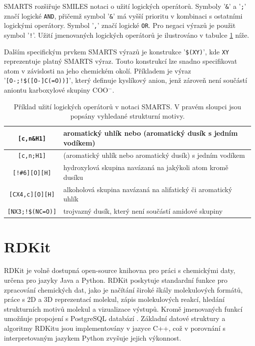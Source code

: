 SMARTS rozšiřuje SMILES notaci o užití logických operátorů. Symboly '\verb|&|' a '\verb|;|' značí logické \verb|AND|, přičemž symbol '\verb|&|' má vyšší prioritu v kombinaci s ostatními logickými operátory. Symbol '\verb|,|' značí logické \verb|OR|. Pro negaci výrazů je použit symbol '\verb|!|'. Užití jmenovaných logických operátorů je ilustrováno v tabulce \ref{logops} níže.

Dalším specifickým prvkem SMARTS výrazů je konstrukce  '\verb|$(XY)|', kde \verb|XY| reprezentuje platný SMARTS výraz. Touto konstrukcí lze snadno specifikovat atom v závislosti na jeho chemickém okolí. Příkladem je výraz '\verb|[O-;!$([O-]C(=O))]|', který definuje kyslíkový anion, jenž zároveň není součástí aniontu karboxylové skupiny COO$^-$. 
\begin{table}[h]
\label{logops}
\renewcommand{\arraystretch}{1.3}
    \begin{small}
    \hspace{7mm}\begin{tabular}{c|l}
        \verb|[c,n&H1]| & aromatický uhlík nebo (aromatický dusík s jedním vodíkem) \\
        \hline
        \verb|[c,n;H1]| & (aromatický uhlík nebo aromatický dusík) s jedním vodíkem \\
        \hline
        \verb|[!#6][O][H]| & hydroxylová skupina navázaná na jakýkoli atom kromě dusíku \\
        \hline
        \verb|[CX4,c][O][H]| & alkoholová skupina navázaná na alifatický či aromatický uhlík \\
        \hline
        \verb|[NX3;!$(NC=O)]| & trojvazný dusík, který není součástí amidové skupiny\\
    \end{tabular}
    \end{small}
    \caption{Příklad užití logických operátorů v notaci SMARTS. V pravém sloupci jsou popsány vyhledané strukturní motivy.}
\end{table}
\section{RDKit}
RDKit \cite{rdk_info} je volně dostupná open-source knihovna pro práci s chemickými daty, určena pro jazyky Java a Python. RDKit poskytuje standardní funkce pro zpracování chemických dat, jako je načítání široké škály molekulových formátů, práce s 2D a 3D reprezentací molekul, zápis molekulových reakcí, hledání strukturních motivů molekul a vizualizace výstupů. Kromě jmenovaných funkcí umožňuje propojení s PostgreSQL databází \cite{Postgre}. Základní datové struktury a algoritmy RDKitu jsou implementovány v jazyce C++, což v porovnání s interpretovaným jazykem Python zvyšuje jejich výkonnost.

